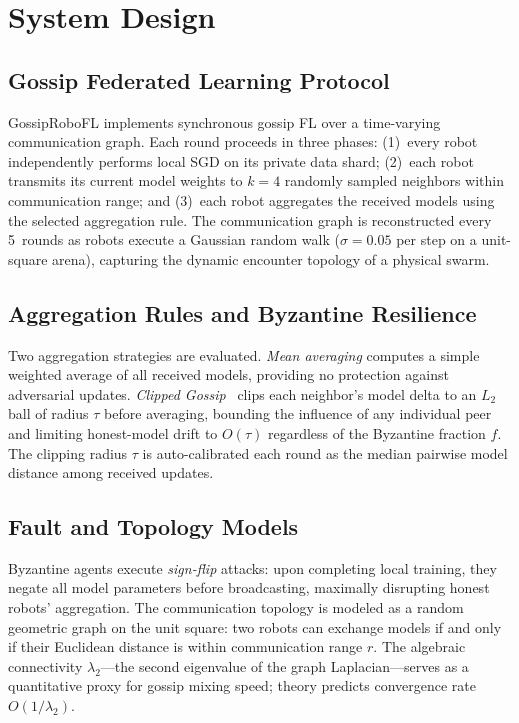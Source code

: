 \documentclass[conference]{IEEEtran}
\newcommand{\sys}{GossipRoboFL\xspace}
\begin{document}
\section{System Design}

\subsection{Gossip Federated Learning Protocol}

\sys implements synchronous gossip FL over a time-varying communication
graph.
Each round proceeds in three phases: (1)~every robot independently performs
local SGD on its private data shard; (2)~each robot transmits its current
model weights to $k{=}4$ randomly sampled neighbors within communication
range; and (3)~each robot aggregates the received models using the selected
aggregation rule.
The communication graph is reconstructed every 5~rounds as robots execute a
Gaussian random walk ($\sigma{=}0.05$ per step on a unit-square arena),
capturing the dynamic encounter topology of a physical swarm.

\subsection{Aggregation Rules and Byzantine Resilience}

Two aggregation strategies are evaluated.
\emph{Mean averaging} computes a simple weighted average of all received
models, providing no protection against adversarial updates.
\emph{Clipped Gossip}~\cite{he2022} clips each
neighbor's model delta to an $L_2$ ball of radius $\tau$ before averaging,
bounding the influence of any individual peer and limiting honest-model drift
to $O(\tau)$ regardless of the Byzantine fraction $f$.
The clipping radius $\tau$ is auto-calibrated each round as the median
pairwise model distance among received updates.

\subsection{Fault and Topology Models}

Byzantine agents execute \emph{sign-flip} attacks: upon completing local
training, they negate all model parameters before broadcasting, maximally
disrupting honest robots' aggregation.
The communication topology is modeled as a random geometric graph on the
unit square: two robots can exchange models if and only if their Euclidean
distance is within communication range $r$.
The algebraic connectivity $\lambda_2$---the second eigenvalue of the graph
Laplacian---serves as a quantitative proxy for gossip mixing speed; theory
predicts convergence rate $O(1/\lambda_2)$.
\end{document}

